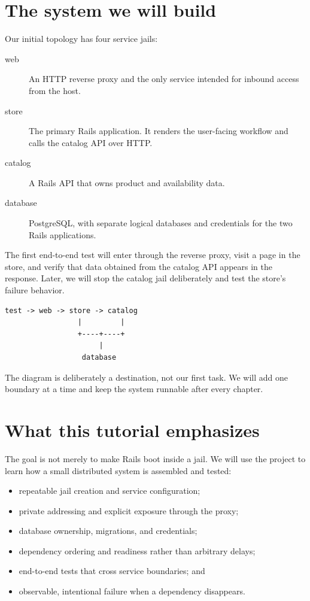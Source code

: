 \section{The system we will build}

Our initial topology has four service jails:

\begin{description}
  \item[web] An HTTP reverse proxy and the only service intended for inbound
    access from the host.
  \item[store] The primary Rails application. It renders the user-facing
    workflow and calls the catalog API over HTTP.
  \item[catalog] A Rails API that owns product and availability data.
  \item[database] PostgreSQL, with separate logical databases and credentials
    for the two Rails applications.
\end{description}

The first end-to-end test will enter through the reverse proxy, visit a page in
the store, and verify that data obtained from the catalog API appears in the
response. Later, we will stop the catalog jail deliberately and test the
store's failure behavior.

\begin{lstlisting}
test -> web -> store -> catalog
                 |         |
                 +----+----+
                      |
                  database
\end{lstlisting}

The diagram is deliberately a destination, not our first task. We will add one
boundary at a time and keep the system runnable after every chapter.

\section{What this tutorial emphasizes}

The goal is not merely to make Rails boot inside a jail. We will use the
project to learn how a small distributed system is assembled and tested:

\begin{itemize}
  \item repeatable jail creation and service configuration;
  \item private addressing and explicit exposure through the proxy;
  \item database ownership, migrations, and credentials;
  \item dependency ordering and readiness rather than arbitrary delays;
  \item end-to-end tests that cross service boundaries; and
  \item observable, intentional failure when a dependency disappears.
\end{itemize}

